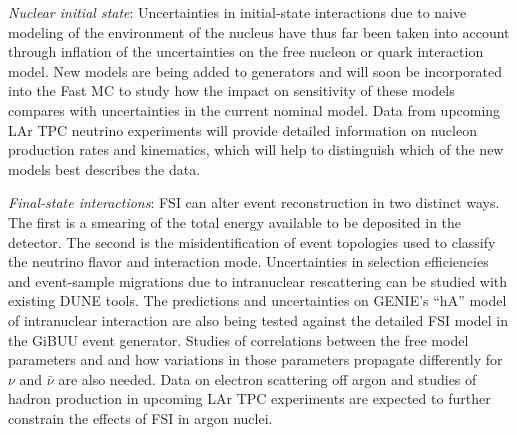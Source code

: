   \emph{Nuclear initial state}: Uncertainties in initial-state interactions due to
  naive modeling of the environment of the nucleus have thus far been taken into account through inflation
  of the uncertainties on the free nucleon or quark interaction
  model. New models are being added to generators and will soon be incorporated into the Fast MC
  to study how the impact on sensitivity of these models compares with uncertainties in the current nominal model.
  Data from upcoming LAr TPC neutrino experiments will provide detailed information on nucleon production
  rates and kinematics, which will help to distinguish which of the new models best describes the data.

  \emph{Final-state interactions}: FSI can alter event reconstruction in two distinct ways. The first is a smearing
  of the total energy available to be deposited in the detector. The second is the misidentification of
  event topologies used to classify the neutrino flavor and interaction mode. Uncertainties in selection
  efficiencies and event-sample migrations
  due to intranuclear rescattering can be studied with existing DUNE tools. The predictions and
  uncertainties on GENIE's ``hA'' model of intranuclear interaction
  are also being tested against the detailed FSI model in the GiBUU event
  generator. Studies of correlations between the free model parameters and and how variations in those
  parameters propagate differently for $\nu$ and $\bar{\nu}$ are also needed. 
  Data on electron scattering off argon and studies of hadron production
  in upcoming LAr TPC experiments are expected to further constrain the effects of FSI in argon nuclei.

